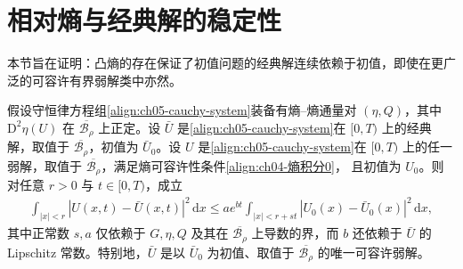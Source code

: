 \documentclass[../../main.tex]{subfiles}
\begin{document}
\section{相对熵与经典解的稳定性}\label{section:ch05-相对熵与经典解的稳定性}

本节旨在证明：凸熵的存在保证了初值问题的经典解连续依赖于初值，即使在更广泛的可容许有界弱解类中亦然。

\begin{theorem}\label{theorem:ch05-相对熵稳定性}
假设守恒律方程组\eqref{align:ch05-cauchy-system}装备有熵--熵通量对 $(\eta,Q)$，其中 $\mathrm{D}^{2}\eta(U)$ 在 $\overline{\mathscr{B}_{\rho}}$ 上正定。设 $\bar{U}$ 是\eqref{align:ch05-cauchy-system}在 $[0,T)$ 上的经典解，取值于 $\overline{\mathscr{B}_{\rho}}$，初值为 $\bar{U}_{0}$。设 $U$ 是\eqref{align:ch05-cauchy-system}在 $[0,T)$ 上的任一弱解，取值于 $\overline{\mathscr{B}_{\rho}}$，满足熵可容许性条件\eqref{align:ch04-熵积分0}，
且初值为 $U_{0}$。则对任意 $r>0$ 与 $t\in[0,T)$，成立
\begin{align}
\int_{|x|<r}|U(x,t)-\bar{U}(x,t)|^{2}\,\mathrm{d}x\leqslant ae^{bt}\int_{|x|<r+st}|U_{0}(x)-\bar{U}_{0}(x)|^{2}\,\mathrm{d}x,\label{align:ch05-relative-stability}
\end{align}
其中正常数 $s,a$ 仅依赖于 $G,\eta,Q$ 及其在 $\overline{\mathscr{B}_{\rho}}$ 上导数的界，而 $b$ 还依赖于 $\bar{U}$ 的 Lipschitz 常数。特别地，$\bar{U}$ 是以 $\bar{U}_{0}$ 为初值、取值于 $\overline{\mathscr{B}_{\rho}}$ 的唯一可容许弱解。
\end{theorem}
\end{document}
